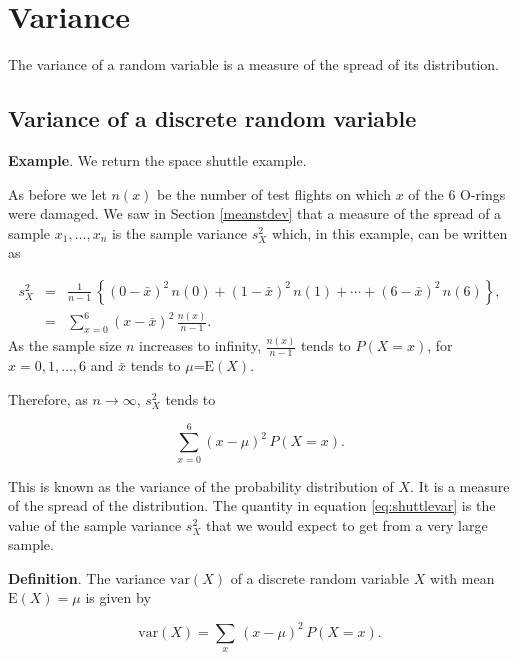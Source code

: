 \documentclass[
  british,
  11pt,
  openany, a4paper]{book}
\begin{document}
\section{Variance}\label{variance}

The variance of a random variable is a measure of the spread of its distribution.

\subsection{Variance of a discrete random variable}\label{variance-of-a-discrete-random-variable}

\textbf{Example}. We return the space shuttle example.

As before we let \(n(x)\) be the number of test flights on which \(x\) of the 6 O-rings were damaged. We saw in Section \ref{meanstdev} that a measure of the spread of a sample \(x_1,\ldots,x_n\) is the sample variance \(s_X^2\) which, in this example, can be written as

\begin{eqnarray*}
s_X^2 &=& \frac{1}{n-1}\,\left\{
(0-\bar{x})^2\,n(0)+(1-\bar{x})^2\,n(1)+\cdots+(6-\bar{x})^2\,n(6) \right\},
\\
      &=& \sum_{x=0}^6 (x-\bar{x})^2\,\frac{n(x)}{n-1}. 
\end{eqnarray*}
As the sample size \(n\) increases to infinity, \(\frac{n(x)}{n-1}\) tends to \(P(X=x)\), for \(x=0,1,\ldots,6\) and \(\bar{x}\) tends to \(\mu\)=\(\mathrm{E}(X)\).

Therefore, as \(n \rightarrow \infty\), \(s_X^2\) tends to

\begin{equation}
\sum_{x=0}^6 (x-\mu)^2\,P(X=x). 
\label{eq:shuttlevar}
\end{equation}

This is known as the variance of the probability distribution of \(X\). It is a measure of the spread of the distribution. The quantity in equation \eqref{eq:shuttlevar} is the value of the sample variance \(s_X^2\) that we would expect to get from a very large sample.

\textbf{Definition}. The variance \(\mathrm{var}(X)\) of a discrete random variable \(X\) with mean \(\mathrm{E}(X)=\mu\) is given by

\begin{equation}
\mathrm{var}(X) = \sum_x\,(x-\mu)^2\,P(X=x). 
\label{eq:varidisc}
\end{equation}
\end{document}
